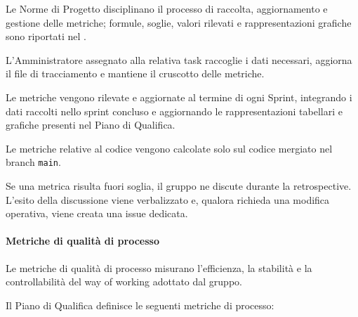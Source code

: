 Le Norme di Progetto disciplinano il processo di raccolta, aggiornamento e gestione
delle metriche; formule, soglie, valori rilevati e rappresentazioni grafiche sono
riportati nel .

L'Amministratore assegnato alla relativa task raccoglie i dati necessari, aggiorna
il file di tracciamento e mantiene il cruscotto delle metriche.

Le metriche vengono rilevate e aggiornate al termine di ogni Sprint, integrando i dati raccolti nello
sprint concluso e aggiornando le rappresentazioni tabellari e grafiche presenti
nel Piano di Qualifica.

Le metriche relative al codice vengono calcolate solo sul codice mergiato nel
branch \texttt{main}.

Se una metrica risulta fuori soglia, il gruppo ne discute durante la retrospective.
L'esito della discussione viene verbalizzato e, qualora richieda una modifica
operativa, viene creata una issue dedicata.

\paragraph{Metriche di qualità di processo}

Le metriche di qualità di processo misurano l'efficienza, la stabilità e la
controllabilità del way of working adottato dal gruppo.

Il Piano di Qualifica definisce le seguenti metriche di processo:

